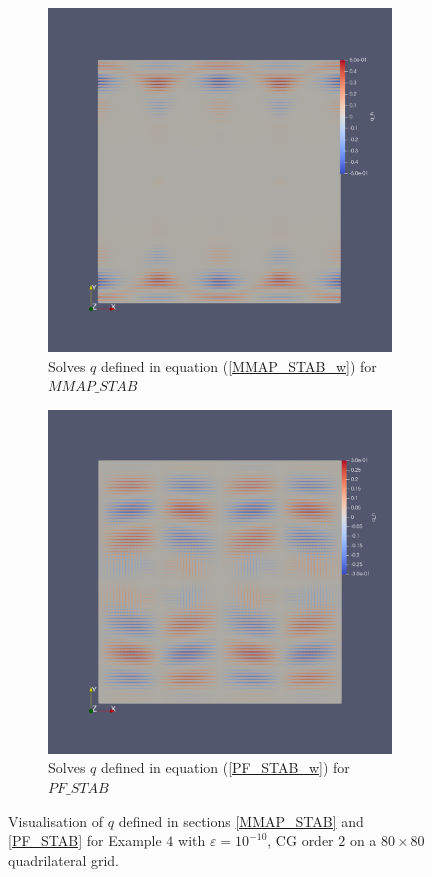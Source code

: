 \documentclass[12pt]{ociamthesis}
\begin{document}
\begin{figure}[H]
 \begin{subfigure}{0.5\textwidth}
     \includegraphics[width=\textwidth]{Pics/ErrorPlots/E4_MMAP_STAB_Q.png}
     \caption{Solves $q$ defined in equation (\ref{MMAP_STAB_w}) for $MMAP\_STAB$}
 \end{subfigure}
   \begin{subfigure}{0.5\textwidth}
     \includegraphics[width=\textwidth]{Pics/ErrorPlots/E4_PF_STAB_Q.png}
     \caption{Solves $q$ defined in equation (\ref{PF_STAB_w}) for $PF\_STAB$}
 \end{subfigure}
 \caption{Visualisation of $q$ defined in sections \ref{MMAP_STAB} and \ref{PF_STAB} for Example $4$ with $\varepsilon = 10^{-10}$, CG order $2$ on a $80 \times 80$ quadrilateral grid.} \label{E3_Q}
\end{figure}
\end{document}
